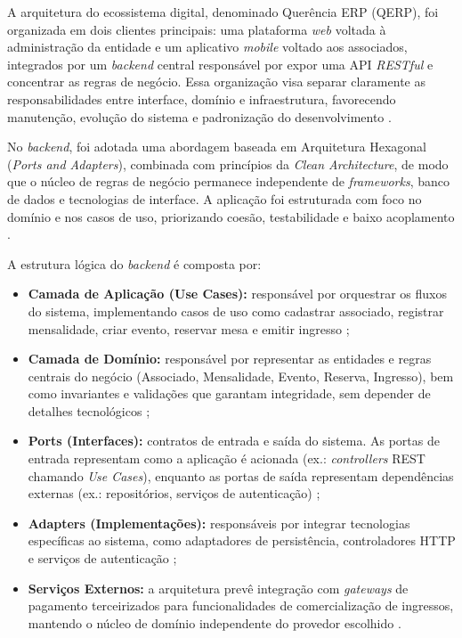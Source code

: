 \documentclass[12pt,a4paper]{article}
\begin{document}
A arquitetura do ecossistema digital, denominado Querência ERP (QERP), foi organizada em dois clientes principais: uma plataforma
\textit{web} voltada à administração da entidade e um aplicativo \textit{mobile} voltado aos
associados, integrados por um \textit{backend} central responsável por expor uma API \textit{RESTful}
e concentrar as regras de negócio. Essa organização visa separar claramente as responsabilidades
entre interface, domínio e infraestrutura, favorecendo manutenção, evolução do sistema e
padronização do desenvolvimento \parencite{fielding2000,martin2017}.

No \textit{backend}, foi adotada uma abordagem baseada em Arquitetura Hexagonal
(\textit{Ports and Adapters}), combinada com princípios da \textit{Clean Architecture}, de modo que
o núcleo de regras de negócio permanece independente de \textit{frameworks}, banco de dados e
tecnologias de interface. A aplicação foi estruturada com foco no domínio e nos casos de uso,
priorizando coesão, testabilidade e baixo acoplamento \parencite{cockburn2005,martin2017}.

A estrutura lógica do \textit{backend} é composta por:
\begin{itemize}
  \item \textbf{Camada de Aplicação (Use Cases):} responsável por orquestrar os fluxos do sistema,
    implementando casos de uso como cadastrar associado, registrar mensalidade, criar evento, reservar
    mesa e emitir ingresso \parencite{martin2017};
  \item \textbf{Camada de Domínio:} responsável por representar as entidades e regras centrais do
    negócio (Associado, Mensalidade, Evento, Reserva, Ingresso), bem como invariantes e validações
    que garantam integridade, sem depender de detalhes tecnológicos \parencite{martin2017};
  \item \textbf{Ports (Interfaces):} contratos de entrada e saída do sistema. As portas de entrada
    representam como a aplicação é acionada (ex.: \textit{controllers} REST chamando \textit{Use
    Cases}), enquanto as portas de saída representam dependências externas (ex.: repositórios,
    serviços de autenticação) \parencite{cockburn2005,martin2017};
  \item \textbf{Adapters (Implementações):} responsáveis por integrar tecnologias específicas ao
    sistema, como adaptadores de persistência, controladores HTTP e serviços de autenticação
    \parencite{cockburn2005};
  \item \textbf{Serviços Externos:} a arquitetura prevê integração com \textit{gateways} de
    pagamento terceirizados para funcionalidades de comercialização de ingressos, mantendo o núcleo
    de domínio independente do provedor escolhido \parencite{martin2017}.
\end{itemize}
\end{document}
